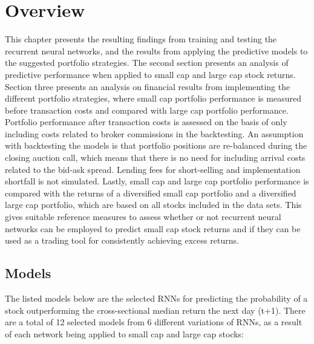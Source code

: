 \section{Overview}
This chapter presents the resulting findings from training and testing the recurrent neural networks, and the results from applying the predictive models to the suggested portfolio strategies. The second section presents an analysis of predictive performance when applied to small cap and large cap stock returns. Section three presents an analysis on financial results from implementing the different portfolio strategies, where small cap portfolio performance is measured before transaction costs and compared with large cap portfolio performance. Portfolio performance after transaction costs is assessed on the basis of only including costs related to broker commissions in the backtesting. An assumption with backtesting the models is that portfolio positions are re-balanced during the closing auction call, which means that there is no need for including arrival costs related to the bid-ask spread. Lending fees for short-selling and implementation shortfall is not simulated. Lastly, small cap and large cap portfolio performance is compared with the returns of a diversified small cap portfolio and a diversified large cap portfolio, which are based on all stocks included in the data sets. This gives suitable reference measures to assess whether or not recurrent neural networks can be employed to predict small cap stock returns and if they can be used as a trading tool for consistently achieving excess returns. 

\subsection{Models}
The listed models below are the selected RNNs for predicting the probability of a stock outperforming the cross-sectional median return the next day (t+1). There are a total of 12 selected models from 6 different variations of RNNs, as a result of each network being applied to small cap and large cap stocks:

